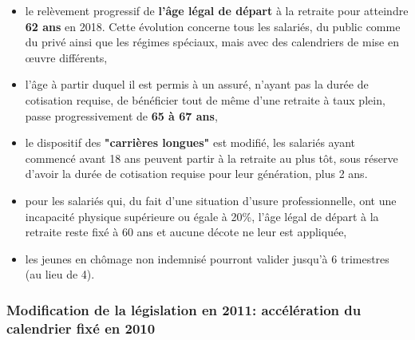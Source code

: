 \begin{itemize}
	\item    le relèvement progressif de \textbf{l'âge légal de départ} à 
la retraite pour atteindre \textbf{62 ans} en 2018. Cette évolution 
concerne tous les salariés, du public comme du privé ainsi 
que les régimes spéciaux, mais avec des calendriers de mise 
en œuvre différents,
	\item    l'âge à partir duquel il est permis à un assuré, 
n'ayant pas la durée de cotisation requise, de bénéficier 
tout de même d'une retraite à taux plein, passe 
progressivement de \textbf{65 à 67 ans},
	\item    le dispositif des \textbf{"carrières longues"} est modifié, 
les salariés ayant commencé avant 18 ans peuvent partir à la 
retraite au plus tôt, sous réserve d'avoir la durée de 
cotisation requise pour leur génération, plus 2 ans.
	\item    pour les salariés qui, du fait d'une situation 
d'usure professionnelle, ont une incapacité physique 
supérieure ou égale à 20\%, l'âge légal de départ à la 
retraite reste fixé à 60 ans et aucune décote ne leur est 
appliquée,
	\item    les jeunes en chômage non indemnisé pourront 
valider jusqu'à 6 trimestres (au lieu de 4).
\end{itemize}

\subsubsection{Modification de la législation en 2011: accélération du calendrier fixé en 2010}

